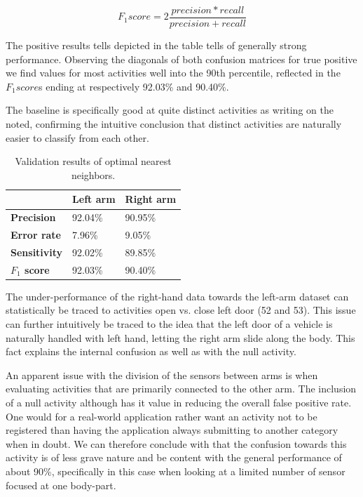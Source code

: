 \documentclass{sig-alternate}
\begin{document}
\begin{equation}
F_1 score = 2 \frac{precision * recall}{precision + recall}
\end{equation}

The positive results tells depicted in the table tells of generally strong performance. Observing the diagonals of both confusion matrices for true positive we find values for most activities well into the 90th percentile, reflected in the $F_1 score$s ending at respectively 92.03\% and 90.40\%.

The baseline is specifically good at quite distinct activities as writing on the noted, confirming the intuitive conclusion that distinct activities are naturally easier to classify from each other.

\begin{table}[bp]
\centering
\caption{Validation results of optimal nearest neighbors.}
\begin{tabular}{|l|l|l|}
\hline
           							&\textbf{Left arm} 				&\textbf{Right arm}		\\ \hline
\textbf{Precision}  				& 92.04\% 		 				& 90.95\%					\\ \hline
\textbf{Error rate} 				& 7.96\%		 				& 9.05\%					\\ \hline
\textbf{Sensitivity}  				& 92.02\%		 				& 89.85\%					\\ \hline
\textbf{$F_{1}$ score}  			& 92.03\%		 				& 90.40\%					\\ \hline

\end{tabular}
\label{tab:comp_left_right}
\end{table}

The under-performance of the right-hand data towards the left-arm dataset can statistically be traced to activities open vs. close left door (52 and 53). This issue can further intuitively be traced to the idea that the left door of a vehicle is naturally handled with left hand, letting the right arm slide along the body. This fact explains the internal confusion as well as with the null activity.

An apparent issue with the division of the sensors between arms is when evaluating activities that are primarily connected to the other arm. The inclusion of a null activity although has it value in reducing the overall false positive rate. One would for a real-world application rather want an activity not to be registered than having the application always submitting to another category when in doubt. We can therefore conclude with that the confusion towards this activity is of less grave nature and be content with the general performance of about 90\%, specifically in this case when looking at a limited number of sensor focused at one body-part.
\end{document}
